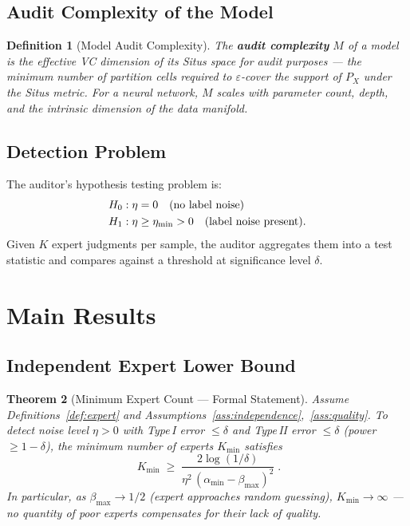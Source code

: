 \documentclass[12pt,a4paper]{article}
\newtheorem{theorem}{Theorem}[section]
\newtheorem{definition}[theorem]{Definition}
\newcommand{\etamin}{\eta_{\min}}
\begin{document}
\subsection{Audit Complexity of the Model}

\begin{definition}[Model Audit Complexity]
\label{def:model-complexity}
The \textbf{audit complexity} $M$ of a model is the effective VC dimension of
its Situs space for audit purposes --- the minimum number of partition cells
required to $\varepsilon$-cover the support of $P_X$ under the Situs metric.
For a neural network, $M$ scales with parameter count, depth, and the
intrinsic dimension of the data manifold.
\end{definition}

\subsection{Detection Problem}

The auditor's hypothesis testing problem is:
\begin{align}
    H_0&: \eta = 0 \quad\text{(no label noise)}\notag\\
    H_1&: \eta \geq \etamin > 0 \quad\text{(label noise present)}.
    \label{eq:hypotheses}
\end{align}
Given $K$ expert judgments per sample, the auditor aggregates them into a test
statistic and compares against a threshold at significance level $\delta$.

\section{Main Results}

\subsection{Independent Expert Lower Bound}

\begin{theorem}[Minimum Expert Count --- Formal Statement]
\label{thm:expert-lower}
Assume Definitions~\ref{def:expert}
and Assumptions~\ref{ass:independence},~\ref{ass:quality}.  To detect noise
level $\eta>0$ with Type\,I error $\leq\delta$ and Type\,II error $\leq\delta$
(power $\geq 1-\delta$), the minimum number of experts $K_{\min}$ satisfies
\begin{equation}\label{eq:K-min}
    \boxed{\;
    K_{\min} \;\geq\;
    \frac{2\log(1/\delta)}
         {\eta^{2}\,(\alpha_{\min}-\beta_{\max})^{2}}
    \;}.
\end{equation}
In particular, as $\beta_{\max}\to 1/2$ (expert approaches random guessing),
$K_{\min}\to\infty$ --- no quantity of poor experts compensates for their lack
of quality.
\end{theorem}
\end{document}
